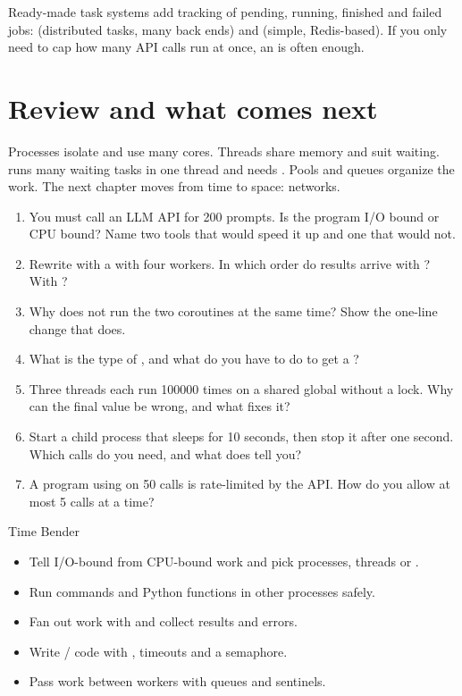 Ready-made task systems add tracking of pending, running, finished and failed jobs: 
(distributed tasks, many back ends) and  (simple, Redis-based). If you only need to cap
how many API calls run at once, an  is often enough.

\section{Review and what comes next}

Processes isolate and use many cores. Threads share memory and suit waiting.  runs
many waiting tasks in one thread and needs . Pools and queues organize the work. The
next chapter moves from time to space: networks.

\begin{practice}
\begin{enumerate}[nosep,leftmargin=*]
  \item You must call an LLM API for 200 prompts. Is the program I/O bound or CPU bound? Name two
        tools that would speed it up and one that would not.
  \item Rewrite  with a  with
        four workers. In which order do results arrive with ? With ?
  \item Why does  not run the two coroutines at the same time? Show
        the one-line change that does.
  \item What is the type of , and what do you have to do to get a
        ?
  \item Three threads each run  100000 times on a shared global without a
        lock. Why can the final value be wrong, and what fixes it?
  \item Start a child process that sleeps for 10 seconds, then stop it after one second. Which
        calls do you need, and what does  tell you?
  \item A program using  on 50 calls is rate-limited by the API. How do you
        allow at most 5 calls at a time?
\end{enumerate}
\end{practice}

\begin{achievement}{Time Bender}
\begin{itemize}[nosep,leftmargin=*]
  \item Tell I/O-bound from CPU-bound work and pick processes, threads or .
  \item Run commands and Python functions in other processes safely.
  \item Fan out work with  and collect results and errors.
  \item Write / code with , timeouts and a semaphore.
  \item Pass work between workers with queues and sentinels.
\end{itemize}
\end{achievement}
